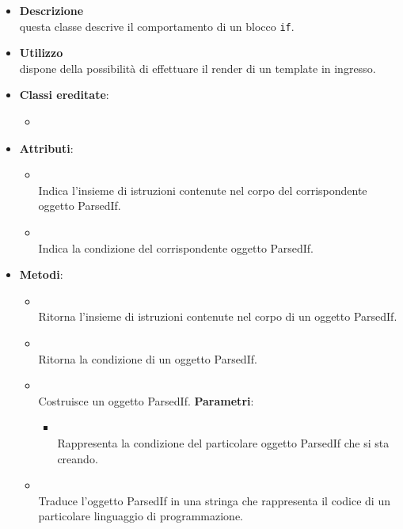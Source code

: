 \begin{itemize}
\item \textbf{Descrizione}\\
questa classe descrive il comportamento di un blocco \texttt{if}.
\item \textbf{Utilizzo}\\
dispone della possibilità di effettuare il render di un template in ingresso.
\item \textbf{Classi ereditate}:
\begin{itemize}
\item \hyperref[\nogloxy{swedesigner::server::project::ParsedInstruction}]{}
\end{itemize}
\item \textbf{Attributi}:
\begin{itemize}
\item {}
\\ Indica l'insieme di istruzioni contenute nel corpo del corrispondente oggetto ParsedIf.
\item {}
\\ Indica la condizione del corrispondente oggetto ParsedIf.
\end{itemize}
\item \textbf{Metodi}:
\begin{itemize}
\item {}
\\ Ritorna l'insieme di istruzioni contenute nel corpo di un oggetto ParsedIf.
\item {}
\\ Ritorna la condizione di un oggetto ParsedIf.
\item {}
\\ Costruisce un oggetto ParsedIf.
\textbf{Parametri}:
\begin{itemize}
\item {}
\\ Rappresenta la condizione del particolare oggetto ParsedIf che si sta creando.
\end{itemize}
\item {}
\\ Traduce l'oggetto ParsedIf in una stringa che rappresenta il codice di un particolare linguaggio di programmazione.

\end{itemize}
\end{itemize}
